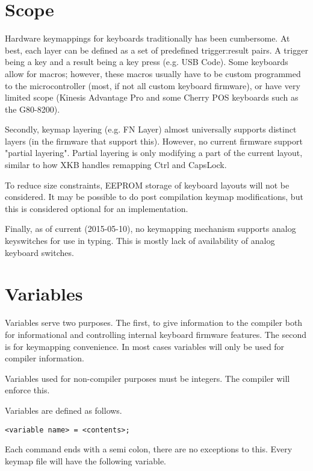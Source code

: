 \documentclass{kiibohd-template}
\begin{document}
\chapter{Scope}

Hardware keymappings for keyboards traditionally has been cumbersome.
At best, each layer can be defined as a set of predefined trigger:result pairs.
A trigger being a key and a result being a key press (e.g. USB Code).
Some keyboards allow for macros; however, these macros usually have to be custom programmed to the microcontroller (most, if not all custom keyboard firmware), or have very limited scope (Kinesis Advantage Pro and some Cherry POS keyboards such as the G80-8200).

Secondly, keymap layering (e.g. FN Layer) almost universally supports distinct layers (in the firmware that support this).
However, no current firmware support "partial layering".
Partial layering is only modifying a part of the current layout, similar to how XKB handles remapping Ctrl and CapsLock.

To reduce size constraints, EEPROM storage of keyboard layouts will not be considered.
It may be possible to do post compilation keymap modifications, but this is considered optional for an implementation.

Finally, as of current (2015-05-10), no keymapping mechanism supports analog keyswitches for use in typing.
This is mostly lack of availability of analog keyboard switches.


\chapter{Variables}

Variables serve two purposes.
The first, to give information to the compiler both for informational and controlling internal keyboard firmware features.
The second is for keymapping convenience.
In most cases variables will only be used for compiler information.

Variables used for non-compiler purposes must be integers.
The compiler will enforce this.

Variables are defined as follows.

\begin{lstlisting}
<variable name> = <contents>;
\end{lstlisting}

Each command ends with a semi colon, there are no exceptions to this.
Every keymap file will have the following variable.
\end{document}
